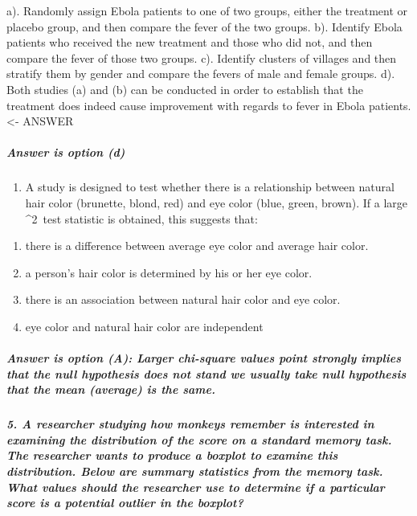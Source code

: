 \documentclass[]{article}
\providecommand{\tightlist}{%
  \setlength{\itemsep}{0pt}\setlength{\parskip}{0pt}}
\let\oldsubparagraph\subparagraph
\renewcommand{\subparagraph}[1]{\oldsubparagraph{#1}\mbox{}}
\begin{document}
a). Randomly assign Ebola patients to one of two groups, either the
treatment or placebo group, and then compare the fever of the two
groups. b). Identify Ebola patients who received the new treatment and
those who did not, and then compare the fever of those two groups. c).
Identify clusters of villages and then stratify them by gender and
compare the fevers of male and female groups. d). Both studies (a) and
(b) can be conducted in order to establish that the treatment does
indeed cause improvement with regards to fever in Ebola patients.
\textless{}- ANSWER

\subparagraph{Answer is option (d)}\label{answer-is-option-d}

\begin{enumerate}
\def\labelenumi{\arabic{enumi}.}
\setcounter{enumi}{3}
\tightlist
\item
  A study is designed to test whether there is a relationship between
  natural hair color (brunette, blond, red) and eye color (blue, green,
  brown). If a large \x\^{}2~test statistic is obtained, this suggests
  that:
\end{enumerate}

\begin{enumerate}
\def\labelenumi{\alph{enumi}.}
\tightlist
\item
  there is a difference between average eye color and average hair
  color.
\item
  a person's hair color is determined by his or her eye color.
\item
  there is an association between natural hair color and eye color.
\item
  eye color and natural hair color are independent
\end{enumerate}

\subparagraph{Answer is option (A): Larger chi-square values point
strongly implies that the null hypothesis does not stand we usually take
null hypothesis that the mean (average) is the
same.}\label{answer-is-option-a-larger-chi-square-values-point-strongly-implies-that-the-null-hypothesis-does-not-stand-we-usually-take-null-hypothesis-that-the-mean-average-is-the-same.}

\subparagraph{5. A researcher studying how monkeys remember is
interested in examining the distribution of the score on a standard
memory task. The researcher wants to produce a boxplot to examine this
distribution. Below are summary statistics from the memory task. What
values should the researcher use to determine if a particular score is a
potential outlier in the
boxplot?}\label{a-researcher-studying-how-monkeys-remember-is-interested-in-examining-the-distribution-of-the-score-on-a-standard-memory-task.-the-researcher-wants-to-produce-a-boxplot-to-examine-this-distribution.-below-are-summary-statistics-from-the-memory-task.-what-values-should-the-researcher-use-to-determine-if-a-particular-score-is-a-potential-outlier-in-the-boxplot}
\end{document}
